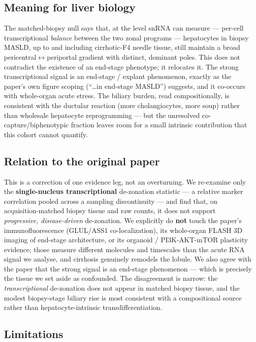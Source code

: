 \documentclass[11pt,a4paper]{article}
\begin{document}
\subsection{Meaning for liver biology}

The matched-biopsy null says that, at the level snRNA can measure --- per-cell transcriptional \emph{balance} between the two zonal programs --- hepatocytes in biopsy MASLD, up to and including cirrhotic-F4 needle tissue, still maintain a broad pericentral$\leftrightarrow$periportal gradient with distinct, dominant poles. This does not contradict the existence of an end-stage phenotype; it relocates it. The strong transcriptional signal is an end-stage / explant phenomenon, exactly as the paper's own figure scoping (``\ldots in end-stage MASLD'') suggests, and it co-occurs with whole-organ acute stress. The biliary burden, read compositionally, is consistent with the ductular reaction (more cholangiocytes, more soup) rather than wholesale hepatocyte reprogramming --- but the unresolved co-capture/biphenotypic fraction leaves room for a small intrinsic contribution that this cohort cannot quantify.

\subsection{Relation to the original paper}

This is a correction of one evidence leg, not an overturning. We re-examine only the \textbf{single-nucleus transcriptional} de-zonation statistic --- a relative marker correlation pooled across a sampling discontinuity --- and find that, on acquisition-matched biopsy tissue and raw counts, it does not support \emph{progressive, disease-driven} de-zonation. We explicitly do \textbf{not} touch the paper's immunofluorescence (GLUL/ASS1 co-localization), its whole-organ FLASH 3D imaging of end-stage architecture, or its organoid / PI3K-AKT-mTOR plasticity evidence; those measure different molecules and timescales than the acute RNA signal we analyse, and cirrhosis genuinely remodels the lobule. We also agree with the paper that the strong signal is an end-stage phenomenon --- which is precisely the tissue we set aside as confounded. The disagreement is narrow: the \emph{transcriptional} de-zonation does not appear in matched biopsy tissue, and the modest biopsy-stage biliary rise is most consistent with a compositional source rather than hepatocyte-intrinsic transdifferentiation.

\subsection{Limitations}
\end{document}
